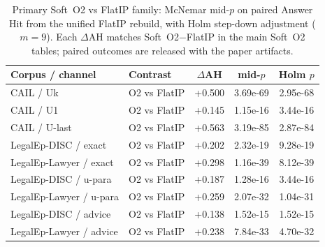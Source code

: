 \documentclass[preprint,12pt,authoryear]{elsarticle}
\newcommand{\compacttab}{\setlength{\tabcolsep}{4.5pt}\renewcommand{\arraystretch}{1.05}}
\begin{document}
\begin{table}[H]
\centering
\caption{Primary Soft~O2 vs FlatIP family: McNemar mid-$p$ on paired Answer Hit from the unified FlatIP rebuild, with Holm step-down adjustment ($m{=}9$). Each $\Delta$AH matches Soft~O2$-$FlatIP in the main Soft~O2 tables; paired outcomes are released with the paper artifacts.}
\label{tab:sig}
\compacttab\footnotesize
\begin{tabular}{@{}llccc@{}}
\toprule
\textbf{Corpus / channel} & \textbf{Contrast} & \textbf{$\Delta$AH} & \textbf{mid-$p$} & \textbf{Holm $p$} \\
\midrule
CAIL / Uk & O2 vs FlatIP & +0.500 & 3.69e-69 & 2.95e-68 \\
CAIL / U1 & O2 vs FlatIP & +0.145 & 1.15e-16 & 3.44e-16 \\
CAIL / U-last & O2 vs FlatIP & +0.563 & 3.19e-85 & 2.87e-84 \\
LegalEp-DISC / exact & O2 vs FlatIP & +0.202 & 2.32e-19 & 9.28e-19 \\
LegalEp-Lawyer / exact & O2 vs FlatIP & +0.298 & 1.16e-39 & 8.12e-39 \\
LegalEp-DISC / u-para & O2 vs FlatIP & +0.187 & 1.28e-16 & 3.44e-16 \\
LegalEp-Lawyer / u-para & O2 vs FlatIP & +0.259 & 2.07e-32 & 1.04e-31 \\
LegalEp-DISC / advice & O2 vs FlatIP & +0.138 & 1.52e-15 & 1.52e-15 \\
LegalEp-Lawyer / advice & O2 vs FlatIP & +0.238 & 7.84e-33 & 4.70e-32 \\
\bottomrule
\end{tabular}
\end{table}
\end{document}
